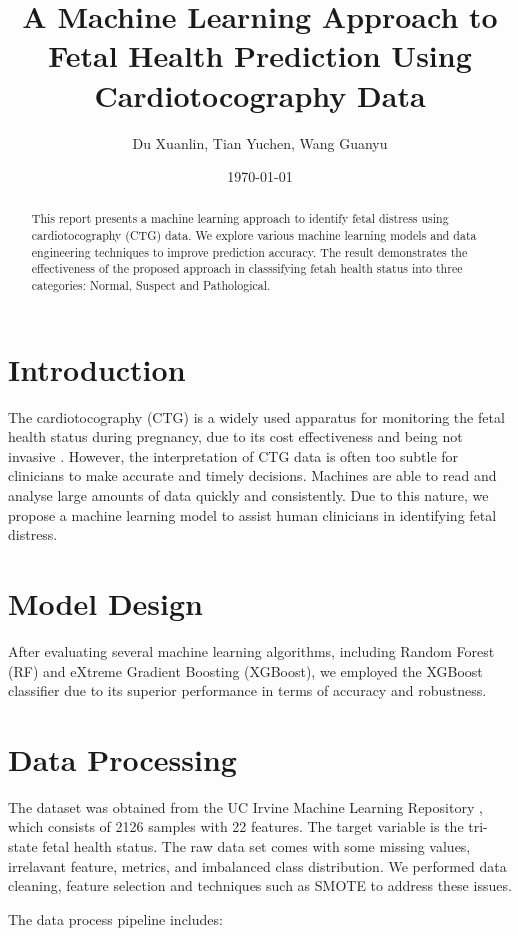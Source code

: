 \documentclass{article}
\title{A Machine Learning Approach to Fetal Health Prediction Using Cardiotocography Data}
\author{Du Xuanlin, Tian Yuchen, Wang Guanyu}
\date{\today}
\begin{document}
\maketitle
\begin{abstract}
This report presents a machine learning approach to identify fetal distress using cardiotocography (CTG) data. We explore various machine learning models and data engineering techniques to improve prediction accuracy. The  result demonstrates the effectiveness of the proposed approach in classsifying fetah health status into three categories: Normal, Suspect and Pathological.
\end{abstract}

\section{Introduction}

The cardiotocography (CTG) is a widely used apparatus for monitoring the fetal health status during pregnancy, due to its cost effectiveness and being not invasive \cite{huang2021investigating}. However, the interpretation of CTG data is often too subtle for clinicians to make accurate and timely decisions. Machines are able to read and analyse large amounts of data quickly and consistently. Due to this nature, we propose a machine learning model to assist human clinicians in identifying fetal distress.

\section{Model Design}
After evaluating several machine learning algorithms, including Random Forest (RF) and eXtreme Gradient Boosting (XGBoost), we employed the XGBoost classifier due to its superior performance in terms of accuracy and robustness. 
\section{Data Processing}
The dataset was obtained from the UC Irvine Machine Learning Repository \cite{cardiotocography_193}, which consists of 2126 samples with 22 features. The target variable is the tri-state fetal health status. The raw data set comes with some missing values, irrelavant feature, metrics, and imbalanced class distribution. We performed data cleaning, feature selection and techniques such as SMOTE to address these issues.

The data process pipeline includes:
\end{document}
